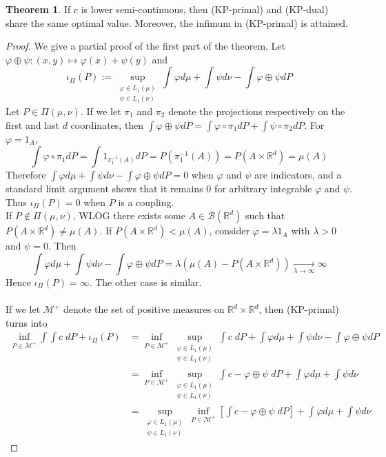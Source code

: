 \documentclass{article}
\theoremstyle{definition}
\newtheorem{thm}{Theorem}[section]
\theoremstyle{remark}
\begin{document}
\begin{thm}
If $c$ is lower semi-continuous, then (KP-primal) and (KP-dual) share the same optimal value. Moreover, the infimum in (KP-primal) is attained.
\end{thm}

\begin{proof}
We give a partial proof of the first part of the theorem. Let $\varphi\oplus \psi:(x,y) \mapsto \varphi(x)+\psi(y)$ and $$\iota_\Pi(P) := \sup_{\substack{\varphi \in L_1(\mu)\\ \psi \in L_1(\nu)}} \int \varphi d\mu + \int \psi d\nu - \int \varphi\oplus \psi dP$$
Let $P\in \Pi(\mu, \nu)$. If we let $\pi_1$ and $\pi_2$ denote the projections respectively on the first and last $d$ coordinates, then $\int \varphi\oplus \psi dP = \int \varphi \circ \pi_1 dP + \int \psi \circ \pi_2 dP$. For $\varphi = 1_A$, $$\int \varphi \circ \pi_1 dP = \int 1_{\pi_1^{-1}(A)} dP = P(\pi_1^{-1}(A)) = P(A\times \mathbb R^d) = \mu(A)$$
Therefore $\int \varphi d\mu + \int \psi d\nu - \int \varphi\oplus \psi dP = 0$ when $\varphi$ and $\psi$ are indicators, and a standard limit argument shows that it remains $0$ for arbitrary integrable $\varphi$ and $\psi$. Thus $\iota_\Pi(P)=0$ when $P$ is a coupling.\\
If $P\notin \Pi(\mu, \nu)$, WLOG there exists some $A\in \mathcal B(\mathbb R^d)$ such that $P(A\times \mathbb R^d)\neq \mu(A)$. If $P(A\times \mathbb R^d)< \mu(A)$, consider $\varphi = \lambda 1_A$ with $\lambda >0$ and $\psi = 0$. Then $$\int \varphi d\mu + \int \psi d\nu - \int \varphi\oplus \psi dP = \lambda (\mu(A) - P(A\times \mathbb R^d)) \xrightarrow[\lambda \to \infty]{} \infty$$ Hence $\iota_\Pi(P)=\infty$. The other case is similar.\\
\\
If we let $\mathcal M^+$ denote the set of positive measures on $\mathbb R^d\times \mathbb R^d$, then (KP-primal) turns into 
$$\begin{aligned}
	\inf_{P\in \mathcal M^+} \int\int c\; dP +  \iota_\Pi(P) 
	&= \inf_{P\in \mathcal M^+} \sup_{\substack{\varphi \in L_1(\mu)\\ \psi \in L_1(\nu)}}  \int c\; dP + \int \varphi d\mu + \int \psi d\nu - \int \varphi\oplus \psi dP \\
	&= \inf_{P\in \mathcal M^+} \sup_{\substack{\varphi \in L_1(\mu)\\ \psi \in L_1(\nu)}}  \int c - \varphi\oplus \psi\; dP + \int \varphi d\mu + \int \psi d\nu \\
	&= \sup_{\substack{\varphi \in L_1(\mu)\\ \psi \in L_1(\nu)}} \inf_{P\in \mathcal M^+}   \left[\int c - \varphi\oplus \psi\; dP\right] + \int \varphi d\mu + \int \psi d\nu

\end{aligned}$$
\end{proof}
\end{document}
